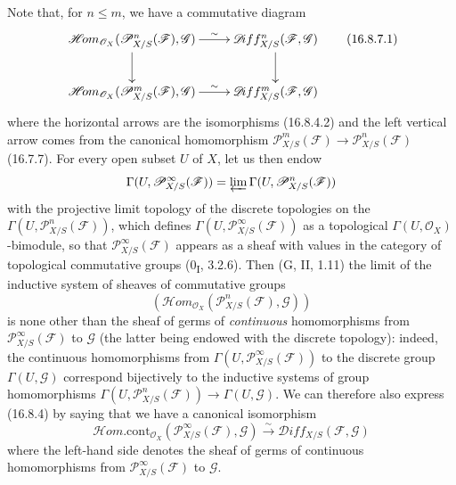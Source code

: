\begin{env}[16.8.7]
Note that, for $n\leq m$, we have a commutative diagram
\[
  \xymatrix{
    \mathscr{H}\!om_{\mathcal{O}_X}
      (\mathscr{P}_{X/S}^n(\mathscr{F}),\mathscr{G})
      \ar[r]^-{\sim}\ar[d]
      &\mathscr{D}\!iff_{X/S}^n(\mathscr{F},\mathscr{G})\ar[d]\\
    \mathscr{H}\!om_{\mathcal{O}_X}
      (\mathscr{P}_{X/S}^m(\mathscr{F}),\mathscr{G})
      \ar[r]^-{\sim}
      &\mathscr{D}\!iff_{X/S}^m(\mathscr{F},\mathscr{G})
  }
  \tag{16.8.7.1}
  \label{IV.16.8.7.1}
\]
where the horizontal arrows are the isomorphisms (16.8.4.2) and the left
vertical arrow comes from the canonical homomorphism
$\mathscr{P}_{X/S}^m(\mathscr{F})\to
\mathscr{P}_{X/S}^n(\mathscr{F})$ (16.7.7). For every open subset $U$ of $X$,
let us then endow
\[
  \Gamma(U,\mathscr{P}_{X/S}^{\infty}(\mathscr{F}))
  =\varprojlim\Gamma(U,\mathscr{P}_{X/S}^n(\mathscr{F}))
\]
with the projective limit topology of the discrete topologies on the
$\Gamma(U,\mathscr{P}_{X/S}^n(\mathscr{F}))$, which defines
$\Gamma(U,\mathscr{P}_{X/S}^{\infty}(\mathscr{F}))$ as a topological
$\Gamma(U,\mathcal{O}_X)$-bimodule, so that
$\mathscr{P}_{X/S}^{\infty}(\mathscr{F})$ appears as a sheaf with values
in the category of topological commutative groups
(0\textsubscript{I}, 3.2.6). Then (G, II, 1.11) the limit of the inductive
system of sheaves of commutative groups
\[
  (\mathscr{H}\!om_{\mathcal{O}_X}
  (\mathscr{P}_{X/S}^n(\mathscr{F}),\mathscr{G}))
\]
is none other than the sheaf of germs of \emph{continuous} homomorphisms from
$\mathscr{P}_{X/S}^{\infty}(\mathscr{F})$ to $\mathscr{G}$ (the latter
being endowed with the discrete topology): indeed, the continuous
homomorphisms from $\Gamma(U,\mathscr{P}_{X/S}^{\infty}(\mathscr{F}))$ to the
discrete group $\Gamma(U,\mathscr{G})$ correspond bijectively to the
inductive systems of group homomorphisms
$\Gamma(U,\mathscr{P}_{X/S}^n(\mathscr{F}))\to\Gamma(U,\mathscr{G})$. We
can therefore also express (16.8.4) by saying that we have a canonical
isomorphism
\[
  \mathscr{H}\!om.\mathrm{cont}_{\mathcal{O}_X}
  (\mathscr{P}_{X/S}^{\infty}(\mathscr{F}),\mathscr{G})
  \xrightarrow{\sim}
  \mathscr{D}\!iff_{X/S}(\mathscr{F},\mathscr{G})
\]
where the left-hand side denotes the sheaf of germs of continuous
homomorphisms from $\mathscr{P}_{X/S}^{\infty}(\mathscr{F})$ to $\mathscr{G}$.
\end{env}

